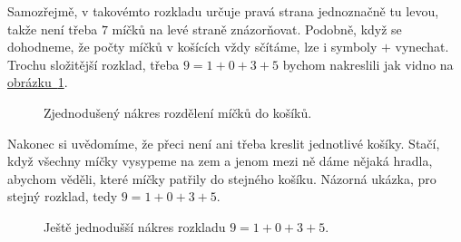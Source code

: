 Samozřejmě, v takovémto rozkladu určuje pravá strana jednoznačně tu levou, takže
není třeba $7$ míčků na levé straně znázorňovat. Podobně, když se dohodneme, že
počty míčků v košících vždy sčítáme, lze i symboly $+$ vynechat. Trochu
složitější rozklad, třeba $9 = 1 + 0 + 3 + 5$ bychom nakreslili jak vidno na
\hyperref[fig:jenom-micky-a-kosiky]{obrázku~\ref*{fig:jenom-micky-a-kosiky}}.

\begin{figure}[h]
 \centering
 \caption{Zjednodušený nákres rozdělení míčků do košíků.}
 \label{fig:jenom-micky-a-kosiky}
\end{figure}

Nakonec si uvědomíme, že přeci není ani třeba kreslit jednotlivé košíky. Stačí,
když všechny míčky vysypeme na zem a jenom mezi ně dáme nějaká hradla, abychom
věděli, které míčky patřily do stejného košíku. Názorná ukázka, pro stejný
rozklad, tedy $9 = 1 + 0 + 3 + 5$.

\begin{figure}[h]
 \centering
 \caption{Ještě jednodušší nákres rozkladu $9 = 1 + 0 + 3 + 5$.}
 \label{fig:nejjednodussi-micky-s-kosiky}
\end{figure}

